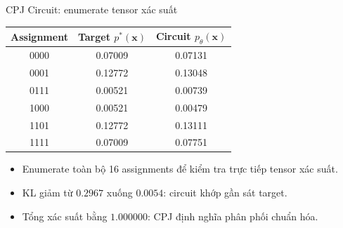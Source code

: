 \begin{frame}{CPJ Circuit: enumerate tensor xác suất}
\centering
\small
\renewcommand{\arraystretch}{1.18}
\begin{tabular}{ccc}
\toprule
\textbf{Assignment} & \textbf{Target $p^*(\mathbf{x})$} & \textbf{Circuit $p_\theta(\mathbf{x})$} \\
\midrule
0000 & 0.07009 & 0.07131 \\
0001 & 0.12772 & 0.13048 \\
0111 & 0.00521 & 0.00739 \\
1000 & 0.00521 & 0.00479 \\
1101 & 0.12772 & 0.13111 \\
1111 & 0.07009 & 0.07751 \\
\bottomrule
\end{tabular}

\vspace{0.35cm}
\begin{itemize}
    \item Enumerate toàn bộ 16 assignments để kiểm tra trực tiếp tensor xác suất.
    \item KL giảm từ $0.2967$ xuống $0.0054$: circuit khớp gần sát target.
    \item Tổng xác suất bằng $1.000000$: CPJ định nghĩa phân phối chuẩn hóa.
\end{itemize}
\end{frame}

